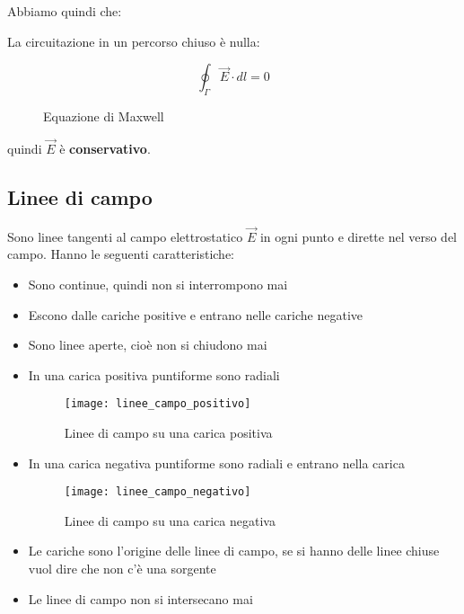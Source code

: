 \documentclass[a4paper]{article}
\begin{document}
Abbiamo quindi che:
\begin{figure}[H]
  \centering
\end{figure}
\noindent
La circuitazione in un percorso chiuso è nulla:
\begin{figure}[H]
  \[
    \oint_{\Gamma} \vec{E} \cdot dl = 0
  \] 
  \caption{Equazione di Maxwell}
\end{figure}
quindi \( \vec{E} \) è \textbf{conservativo}.

\subsection{Linee di campo}
Sono linee tangenti al campo elettrostatico \( \vec{E} \) in ogni punto e dirette
nel verso del campo. Hanno le seguenti caratteristiche:
\begin{itemize}
  \item Sono continue, quindi non si interrompono mai
  \item Escono dalle cariche positive e entrano nelle cariche negative
  \item Sono linee aperte, cioè non si chiudono mai

  \item In una carica positiva puntiforme sono radiali
    \begin{figure}[H]
      \centering
      \texttt{[image: linee\_campo\_positivo]}
      \caption{Linee di campo su una carica positiva}
    \end{figure}

  \item In una carica negativa puntiforme sono radiali e entrano nella carica
    \begin{figure}[H]
      \centering
      \texttt{[image: linee\_campo\_negativo]}
      \caption{Linee di campo su una carica negativa}
    \end{figure}

  \item Le cariche sono l'origine delle linee di campo, se si hanno delle linee chiuse
    vuol dire che non c'è una sorgente

  \item Le linee di campo non si intersecano mai
\end{itemize}
\end{document}
